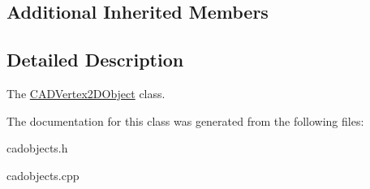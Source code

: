 \subsection*{Additional Inherited Members}


\subsection{Detailed Description}
The \hyperlink{class_c_a_d_vertex2_d_object}{C\+A\+D\+Vertex2\+D\+Object} class. 

The documentation for this class was generated from the following files\+:\begin{DoxyCompactItemize}
\item 
cadobjects.\+h\item 
cadobjects.\+cpp\end{DoxyCompactItemize}
